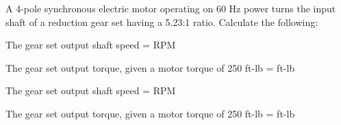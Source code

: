 

A 4-pole synchronous electric motor operating on 60 Hz power turns the input shaft of a reduction gear set having a 5.23:1 ratio.  Calculate the following:

\vskip 10pt

The gear set output shaft speed = \underbar{\hskip 50pt} RPM

\vskip 10pt

The gear set output torque, given a motor torque of 250 ft-lb = \underbar{\hskip 50pt} ft-lb








The gear set output shaft speed =  RPM

\vskip 10pt

The gear set output torque, given a motor torque of 250 ft-lb =  ft-lb











